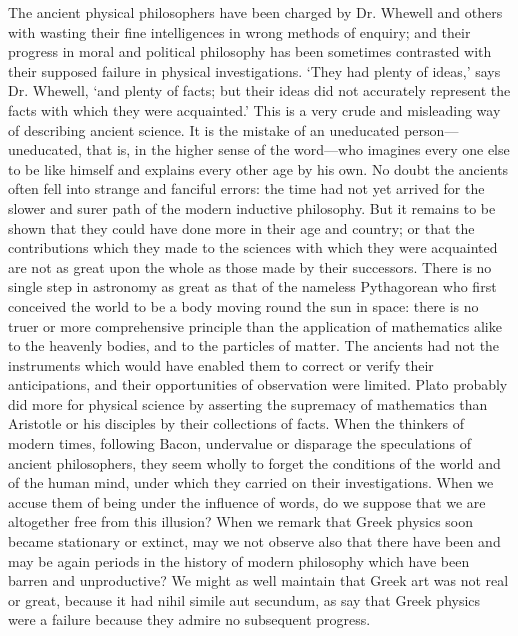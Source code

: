 \documentclass[11pt,letter]{article}
\begin{document}
\par  The ancient physical philosophers have been charged by Dr. Whewell and others with wasting their fine intelligences in wrong methods of enquiry; and their progress in moral and political philosophy has been sometimes contrasted with their supposed failure in physical investigations. ‘They had plenty of ideas,’ says Dr. Whewell, ‘and plenty of facts; but their ideas did not accurately represent the facts with which they were acquainted.’ This is a very crude and misleading way of describing ancient science. It is the mistake of an uneducated person—uneducated, that is, in the higher sense of the word—who imagines every one else to be like himself and explains every other age by his own. No doubt the ancients often fell into strange and fanciful errors: the time had not yet arrived for the slower and surer path of the modern inductive philosophy. But it remains to be shown that they could have done more in their age and country; or that the contributions which they made to the sciences with which they were acquainted are not as great upon the whole as those made by their successors. There is no single step in astronomy as great as that of the nameless Pythagorean who first conceived the world to be a body moving round the sun in space: there is no truer or more comprehensive principle than the application of mathematics alike to the heavenly bodies, and to the particles of matter. The ancients had not the instruments which would have enabled them to correct or verify their anticipations, and their opportunities of observation were limited. Plato probably did more for physical science by asserting the supremacy of mathematics than Aristotle or his disciples by their collections of facts. When the thinkers of modern times, following Bacon, undervalue or disparage the speculations of ancient philosophers, they seem wholly to forget the conditions of the world and of the human mind, under which they carried on their investigations. When we accuse them of being under the influence of words, do we suppose that we are altogether free from this illusion? When we remark that Greek physics soon became stationary or extinct, may we not observe also that there have been and may be again periods in the history of modern philosophy which have been barren and unproductive? We might as well maintain that Greek art was not real or great, because it had nihil simile aut secundum, as say that Greek physics were a failure because they admire no subsequent progress.
\end{document}
